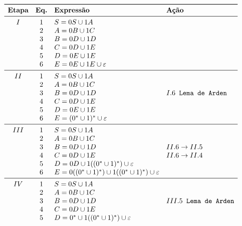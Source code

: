 \documentclass[12pt]{article}
\begin{document}
\begin{tcolorbox}[breakable,rounded corners, colback=yellow!5, colframe=red!40!black, title={Extração de expressão regular $\mathcal{R}_1$ da gramática $G$, tal que $\mathcal{L}(\mathcal{R}_1)=\mathcal{L}(G_1)$}]
  $$
  \begin{array}{ccll}
  \toprule
  \textbf{Etapa} & \textbf{Eq.} & \textbf{Expressão} & \textbf{Ação}\\
  \midrule
    I & 1 & S = 0S \cup 1A           &\\
      & 2 & A = 0B \cup 1C           &\\
      & 3 & B = 0D \cup 1D           &\\
      & 4 & C = 0D \cup 1E           &\\
      & 5 & D = 0E \cup 1E           &\\
      & 6 & E = 0E \cup 1E \cup \varepsilon   &\\
  \midrule
   II & 1 & S = 0S \cup 1A           &\\
      & 2 & A = 0B \cup 1C           &\\
      & 3 & B = 0D \cup 1D           &I.6\texttt{ Lema de Arden}\\
      & 4 & C = 0D \cup 1E           &\\
      & 5 & D = 0E \cup 1E           &\\
      & 6 & E = (0^*\cup1)^* \cup \varepsilon   &\\     
  \midrule
  III & 1 & S = 0S \cup 1A           &\\
      & 2 & A = 0B \cup 1C           &\\
      & 3 & B = 0D \cup 1D           &II.6\to II.5\\
      & 4 & C = 0D \cup 1E           &II.6\to II.4\\
      & 5 & D = 0D\cup1((0^*\cup1)^*)\cup\varepsilon          &\\
      & 6 & E = 0((0^*\cup1)^*)\cup1((0^*\cup1)^*)\cup\varepsilon   &\\
  \midrule
   IV & 1 & S = 0S \cup 1A           &\\
      & 2 & A = 0B \cup 1C           &\\
      & 3 & B = 0D \cup 1D           &III.5\texttt{ Lema de Arden}\\
      & 4 & C = 0D \cup 1E           &\\
      & 5 & D = 0^*\cup1((0^*\cup1)^*)\cup\varepsilon          &\\

\end{array}$$
\end{tcolorbox}
\end{document}
